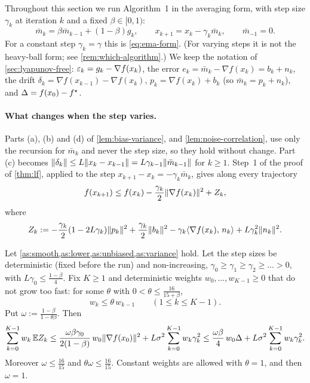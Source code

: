 Throughout this section we run Algorithm~1 in the averaging form, with step size
$\gamma_k$ at iteration $k$ and a fixed $\beta\in[0,1)$:
\begin{equation}\label{eq:ema-varying}
  \bar m_k=\beta\bar m_{k-1}+(1-\beta)g_k,\qquad x_{k+1}=x_k-\gamma_k\bar m_k,\qquad\bar m_{-1}=0 .
\end{equation}
For a constant step $\gamma_k=\gamma$ this is \eqref{eq:ema-form}. (For varying steps it
is not the heavy-ball form; see \cref{rem:which-algorithm}.) We keep the notation of
\cref{sec:lyapunov-free}: $\varepsilon_k=g_k-\nabla f(x_k)$, the error
$e_k=\bar m_k-\nabla f(x_k)=b_k+n_k$, the drift $\delta_k=\nabla f(x_{k-1})-\nabla f(x_k)$,
$p_k=\nabla f(x_k)+b_k$ (so $\bar m_k=p_k+n_k$), and $\Delta=f(x_0)-f^\star$.

\paragraph{What changes when the step varies.} Parts (a), (b) and (d) of
\cref{lem:bias-variance}, and \cref{lem:noise-correlation}, use only the recursion for
$\bar m_k$ and never the step size, so they hold without change. Part (c) becomes
$\lVert \delta_k\rVert\le L\lVert x_k-x_{k-1}\rVert=L\gamma_{k-1}\lVert \bar m_{k-1}\rVert$ for $k\ge1$. Step~1
of the proof of \cref{thm:lf}, applied to the step $x_{k+1}-x_k=-\gamma_k\bar m_k$, gives
along every trajectory
\begin{equation}\label{eq:lf-step-varying}
  f(x_{k+1})\le f(x_k)-\frac{\gamma_k}{2}\lVert \nabla f(x_k)\rVert^2+Z_k,
\end{equation}
where
\begin{equation}\label{eq:Zk}
  Z_k:=-\frac{\gamma_k}{2}(1-2L\gamma_k)\lVert p_k\rVert^2+\frac{\gamma_k}{2}\lVert b_k\rVert^2
  -\gamma_k\langle \nabla f(x_k),\, n_k\rangle+L\gamma_k^2\lVert n_k\rVert^2 .
\end{equation}

\begin{tcolorbox}[keybox]
\begin{lemma}\label{lem:weighted-budget}
Let \cref{as:smooth,as:lower,as:unbiased,as:variance} hold. Let the step sizes be
deterministic (fixed before the run) and non-increasing, $\gamma_0\ge\gamma_1\ge\gamma_2\ge\dots>0$,
with $L\gamma_0\le\frac{1-\beta}{4}$. Fix $K\ge1$ and deterministic weights
$w_0,\dots,w_{K-1}\ge0$ that do not grow too fast: for some $\theta$ with
$0<\theta\le\frac{16}{15+\beta}$,
\[
  w_k\le\theta\,w_{k-1}\qquad(1\le k\le K-1).
\]
Put $\omega:=\frac{1-\beta}{1-\theta\beta}$. Then
\begin{equation}\label{eq:weighted-budget}
  \sum_{k=0}^{K-1}w_k\,\mathbb{E} Z_k
  \le\frac{\omega\beta\gamma_0}{2(1-\beta)}\,w_0\lVert \nabla f(x_0)\rVert^2+L\sigma^2\sum_{k=0}^{K-1}w_k\gamma_k^2
  \le\frac{\omega\beta}{4}\,w_0\Delta+L\sigma^2\sum_{k=0}^{K-1}w_k\gamma_k^2 .
\end{equation}
Moreover $\omega\le\frac{16}{15}$ and $\theta\omega\le\frac{16}{15}$. Constant weights are allowed
with $\theta=1$, and then $\omega=1$.
\end{lemma}
\end{tcolorbox}

